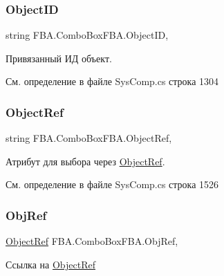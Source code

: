 \subsubsection{\texorpdfstring{Object\+ID}{ObjectID}}
{\footnotesize\ttfamily string F\+B\+A.\+Combo\+Box\+F\+B\+A.\+Object\+ID\hspace{0.3cm}{\ttfamily [get]}, {\ttfamily [set]}}



Привязанный ИД объект. 



См. определение в файле Sys\+Comp.\+cs строка 1304

\mbox{\label{class_f_b_a_1_1_combo_box_f_b_a_a0df782ba3f7a2e10c0595a4f5c21e34b}} 
\subsubsection{\texorpdfstring{Object\+Ref}{ObjectRef}}
{\footnotesize\ttfamily string F\+B\+A.\+Combo\+Box\+F\+B\+A.\+Object\+Ref\hspace{0.3cm}{\ttfamily [get]}, {\ttfamily [set]}}



Атрибут для выбора через \mbox{\hyperlink{class_f_b_a_1_1_object_ref}{Object\+Ref}}. 



См. определение в файле Sys\+Comp.\+cs строка 1526

\mbox{\label{class_f_b_a_1_1_combo_box_f_b_a_a34e0763764dad7ab9cd3f42cc667e815}} 
\subsubsection{\texorpdfstring{Obj\+Ref}{ObjRef}}
{\footnotesize\ttfamily \mbox{\hyperlink{class_f_b_a_1_1_object_ref}{Object\+Ref}} F\+B\+A.\+Combo\+Box\+F\+B\+A.\+Obj\+Ref\hspace{0.3cm}{\ttfamily [get]}, {\ttfamily [set]}}



Ссылка на \mbox{\hyperlink{class_f_b_a_1_1_object_ref}{Object\+Ref}} 



